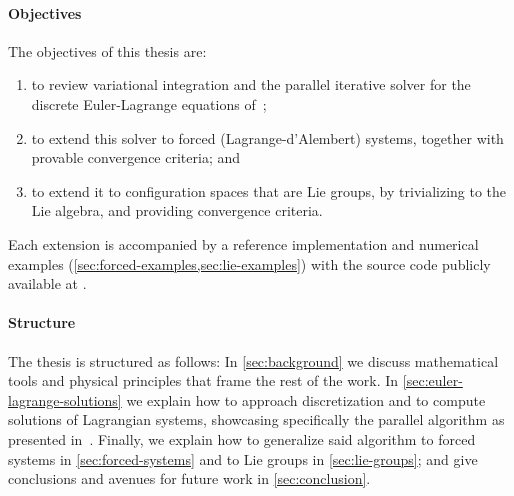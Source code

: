 \paragraph{Objectives} The objectives of this thesis are:
\begin{enumerate}
	\item to review variational integration and the parallel iterative solver for the discrete Euler-Lagrange equations of~\cite{ferraroParallelIterativeMethod2025};
	\item to extend this solver to forced (Lagrange-d'Alembert) systems, together with provable convergence criteria; and
	\item to extend it to configuration spaces that are Lie groups, by trivializing to the Lie algebra, and providing convergence criteria.
\end{enumerate}

Each extension is accompanied by a reference implementation and numerical examples (\cref{sec:forced-examples,sec:lie-examples}) with the source code publicly available at \repo{}.

\paragraph{Structure} The thesis is structured as follows: In \cref{sec:background} we discuss mathematical tools and physical principles that frame the rest of the work. In \cref{sec:euler-lagrange-solutions} we explain how to approach discretization and to compute solutions of Lagrangian systems, showcasing specifically the parallel algorithm as presented in~\cite{ferraroParallelIterativeMethod2025}. Finally, we explain how to generalize said algorithm to forced systems in \cref{sec:forced-systems} and to Lie groups in \cref{sec:lie-groups}; and give conclusions and avenues for future work in \cref{sec:conclusion}.

